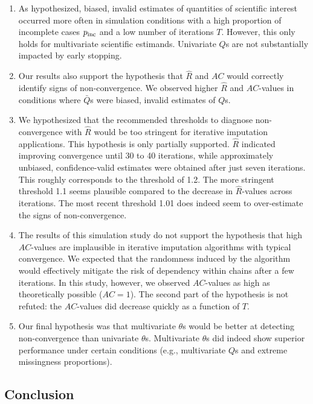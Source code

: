 \documentclass[Royal,times,sageh]{sagej}
\begin{document}
\begin{enumerate}
\def\labelenumi{\arabic{enumi}.}
\item
  As hypothesized, biased, invalid estimates of quantities of scientific interest occurred more often in simulation conditions with a high proportion of incomplete cases \(p_{\rm inc}\) and a low number of iterations \(T\). However, this only holds for multivariate scientific estimands. Univariate \(Q\)s are not substantially impacted by early stopping.
\item
  Our results also support the hypothesis that \(\widehat{R}\) and \(AC\) would correctly identify signs of non-convergence. We observed higher \(\widehat{R}\) and \(AC\)-values in conditions where \(\bar{Q}\)s were biased, invalid estimates of \(Q\)s.
\item
  We hypothesized that the recommended thresholds to diagnose non-convergence with \(\widehat{R}\) would be too stringent for iterative imputation applications. This hypothesis is only partially supported. \(\widehat{R}\) indicated improving convergence until 30 to 40 iterations, while approximately unbiased, confidence-valid estimates were obtained after just seven iterations. This roughly corresponds to the threshold of 1.2. The more stringent threshold 1.1 seems plausible compared to the decrease in \(\widehat{R}\)-values across iterations. The most recent threshold 1.01 does indeed seem to over-estimate the signs of non-convergence.
\item
  The results of this simulation study do not support the hypothesis that high \(AC\)-values are implausible in iterative imputation algorithms with typical convergence. We expected that the randomness induced by the algorithm would effectively mitigate the risk of dependency within chains after a few iterations. In this study, however, we observed \(AC\)-values as high as theoretically possible (\(AC=1\)). The second part of the hypothesis is not refuted: the \(AC\)-values did decrease quickly as a function of \(T\).
\item
  Our final hypothesis was that multivariate \(\theta\)s would be better at detecting non-convergence than univariate \(\theta\)s. Multivariate \(\theta\)s did indeed show superior performance under certain conditions (e.g., multivariate \(Q\)s and extreme missingness proportions).
\end{enumerate}

\hypertarget{conclusion}{%
\subsection{Conclusion}\label{conclusion}}
\end{document}
